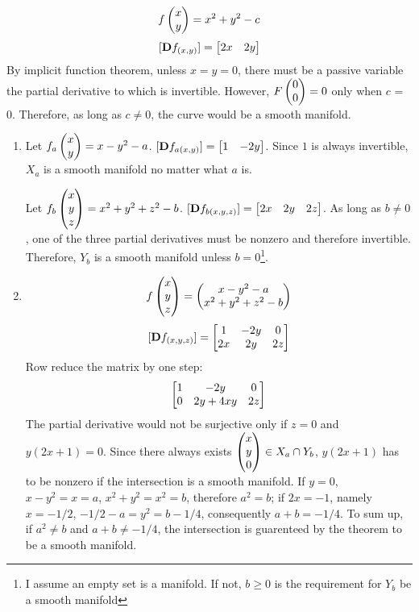 \documentclass{homework}
\begin{document}
\begin{problem}{6}
$$f\begin{pmatrix}x\\y\end{pmatrix} = x^2 + y^2 -c$$
$$[\mathbf{D}f_{(x,y)}] = \begin{bmatrix}2x&2y\end{bmatrix}$$
By implicit function theorem, unless $x = y = 0$, there must be a passive variable the partial derivative to which is invertible. However, $F\begin{pmatrix}0\\0\end{pmatrix} = 0$ only when $c$ = 0. Therefore, as long as $c \neq 0$, the curve would be a smooth manifold.
\end{problem}

\begin{problem}{7}
\begin{enumerate}
\item
Let $f_a\begin{pmatrix}x\\y\end{pmatrix} = x-y^2 - a$. $[\mathbf{D}f_{a{(x,y)}}] = \begin{bmatrix}1&-2y\end{bmatrix}$. Since $1$ is always invertible, $X_a$ is a smooth manifold no matter what $a$ is.

Let $f_b\begin{pmatrix}x\\y\\z\end{pmatrix} = x^2+y^2+z^2-b$. $[\mathbf{D}f_{b{(x,y,z)}}] = \begin{bmatrix}2x&2y&2z\end{bmatrix}$. As long as $b \neq 0$, one of the three partial derivatives must be nonzero and therefore invertible. Therefore, $Y_b$ is a smooth manifold unless $b = 0$\footnote{I assume an empty set is a manifold. If not, $b \ge 0$ is the requirement for $Y_b$ be a smooth manifold}.
\item
$$f\begin{pmatrix}x\\y\\z\end{pmatrix} = \begin{pmatrix}x-y^2-a\\x^2+y^2+z^2-b\end{pmatrix}$$
$$[\mathbf{D}f_{(x,y,z)}] = \begin{bmatrix}1&-2y&0\\2x&2y&2z\end{bmatrix}$$
Row reduce the matrix by one step:
$$\begin{bmatrix}1&-2y&0\\0&2y+4xy&2z\end{bmatrix}$$
The partial derivative would not be surjective only if $z = 0$ and $y(2x+1) = 0$. Since there always exists $\begin{pmatrix}x\\y\\0\end{pmatrix} \in X_a \cap Y_b$, $y(2x+1)$ has to be nonzero if the intersection is a smooth manifold. If $y = 0$, $x-y^2=x=a$, $x^2+y^2=x^2=b$, therefore $a^2=b$; if $2x=-1$, namely $x=-1/2$, $-1/2-a=y^2=b-1/4$, consequently $a+b=-1/4$. To sum up, if $a^2 \neq b$ and $a + b \neq -1/4$, the intersection is guarenteed by the theorem to be a smooth manifold.
\end{enumerate}
\end{problem}
\end{document}
